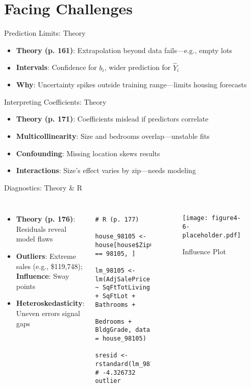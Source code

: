 \documentclass{beamer}
\begin{document}
	\section{Facing Challenges}
	
	\begin{frame}{Prediction Limits: Theory}
		\begin{itemize}
			\item \textbf{Theory (p. 161)}: Extrapolation beyond data fails—e.g., empty lots
			\item \textbf{Intervals}: Confidence for $b_i$, wider prediction for $\hat{Y}_i$
			\item \textbf{Why}: Uncertainty spikes outside training range—limits housing forecasts
		\end{itemize}
	\end{frame}
	
	\begin{frame}{Interpreting Coefficients: Theory}
		\begin{itemize}
			\item \textbf{Theory (p. 171)}: Coefficients mislead if predictors correlate
			\item \textbf{Multicollinearity}: Size and bedrooms overlap—unstable fits
			\item \textbf{Confounding}: Missing location skews results
			\item \textbf{Interactions}: Size’s effect varies by zip—needs modeling
		\end{itemize}
	\end{frame}
	
	\begin{frame}[fragile]{Diagnostics: Theory \& R}
		\begin{columns}
			\begin{itemize}
				\item \textbf{Theory (p. 176)}: Residuals reveal model flaws
				\item \textbf{Outliers}: Extreme sales (e.g., \$119,748); \textbf{Influence}: Sway points
				\item \textbf{Heteroskedasticity}: Uneven errors signal gaps
			\end{itemize}
			\begin{lstlisting}
				# R (p. 177)
				house_98105 <- house[house$ZipCode == 98105, ]
				lm_98105 <- lm(AdjSalePrice ~ SqFtTotLiving + SqFtLot + Bathrooms +
				Bedrooms + BldgGrade, data = house_98105)
				sresid <- rstandard(lm_98105)  # -4.326732 outlier
			\end{lstlisting}
			\begin{figure}
				\texttt{[image: figure4-6-placeholder.pdf]}
				\caption{Influence Plot}
			\end{figure}
		\end{columns}
	\end{frame}
	
\end{document}
